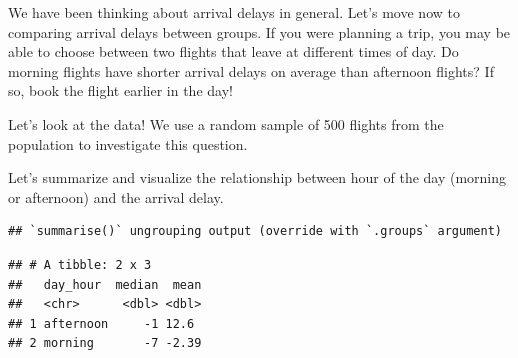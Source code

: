 \documentclass[
]{book}
\newenvironment{Shaded}{\begin{snugshade}}{\end{snugshade}}
\newcommand{\DataTypeTok}[1]{\textcolor[rgb]{0.13,0.29,0.53}{#1}}
\newcommand{\DecValTok}[1]{\textcolor[rgb]{0.00,0.00,0.81}{#1}}
\newcommand{\KeywordTok}[1]{\textcolor[rgb]{0.13,0.29,0.53}{\textbf{#1}}}
\newcommand{\NormalTok}[1]{#1}
\newcommand{\OperatorTok}[1]{\textcolor[rgb]{0.81,0.36,0.00}{\textbf{#1}}}
\newcommand{\StringTok}[1]{\textcolor[rgb]{0.31,0.60,0.02}{#1}}
\begin{document}
We have been thinking about arrival delays in general. Let's move now to comparing arrival delays between groups. If you were planning a trip, you may be able to choose between two flights that leave at different times of day. Do morning flights have shorter arrival delays on average than afternoon flights? If so, book the flight earlier in the day!

Let's look at the data! We use a random sample of 500 flights from the population to investigate this question.

\begin{Shaded}
\end{Shaded}

Let's summarize and visualize the relationship between hour of the day (morning or afternoon) and the arrival delay.

\begin{Shaded}
\end{Shaded}

\begin{verbatim}
## `summarise()` ungrouping output (override with `.groups` argument)
\end{verbatim}

\begin{verbatim}
## # A tibble: 2 x 3
##   day_hour  median  mean
##   <chr>      <dbl> <dbl>
## 1 afternoon     -1 12.6 
## 2 morning       -7 -2.39
\end{verbatim}

\begin{Shaded}
\end{Shaded}
\end{document}
